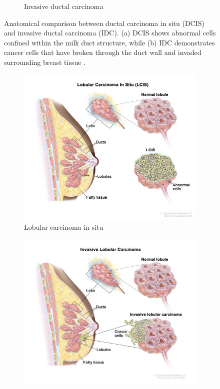 \documentclass[a4paper,10pt]{book}
\begin{document}
\begin{figure}[h!]
\begin{subfigure}[c]{0.48\textwidth}
		\caption{Invasive ductal carcinoma}
		\label{fig:idc}
	\end{subfigure}
	\caption[DCIS vs. IDC comparison]{Anatomical comparison between ductal carcinoma in situ (DCIS) and invasive ductal carcinoma (IDC). (a) DCIS shows abnormal cells confined within the milk duct structure, while (b) IDC demonstrates cancer cells that have broken through the duct wall and invaded surrounding breast tissue \cite{noauthor_nci_2011}.}
	\label{fig:histological_types_one}
\end{figure}

\begin{figure}[h!]
	\centering
	\begin{subfigure}[c]{0.48\textwidth}
		\centering
		\includegraphics[width=\textwidth]{reports/assets/lcis.jpg}
		\caption{Lobular carcinoma in situ}
		\label{fig:lcis}
	\end{subfigure}
	\begin{subfigure}[c]{0.48\textwidth}
		\centering
		\includegraphics[width=\textwidth]{reports/assets/ilc.jpg}

\end{subfigure}
\end{figure}
\end{document}
